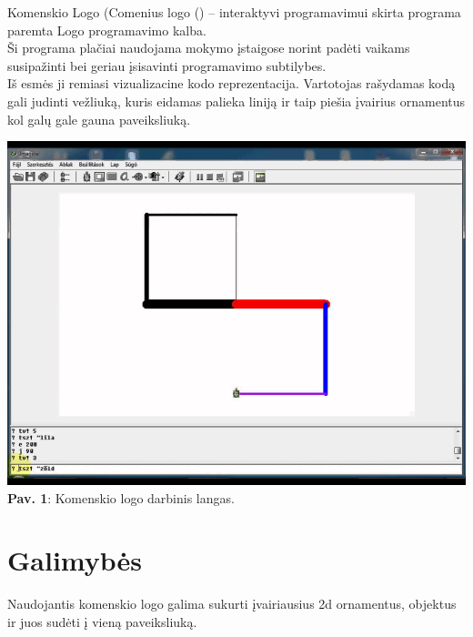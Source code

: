\documentclass[a4paper,12pt]{article}
\begin{document}
Komenskio Logo (Comenius logo ({\cite {Comenius logo}}) – interaktyvi programavimui skirta programa paremta Logo programavimo kalba. \\
Ši programa plačiai naudojama mokymo įstaigose norint padėti vaikams susipažinti bei geriau įsisavinti programavimo subtilybes. \\

Iš esmės ji remiasi vizualizacine kodo reprezentacija. Vartotojas rašydamas kodą gali judinti vežliuką, kuris eidamas palieka liniją ir taip piešia įvairius ornamentus kol galų gale gauna paveiksliuką. 

\begin{center}
\includegraphics[scale=0.9]{LogoPvz1.png}\\
\textbf{Pav. 1}: Komenskio logo darbinis langas.\\
\end{center}

\newpage

\section{Galimybės}

Naudojantis komenskio logo galima sukurti įvairiausius 2d ornamentus, objektus ir juos sudėti į vieną paveiksliuką. \\
\end{document}
